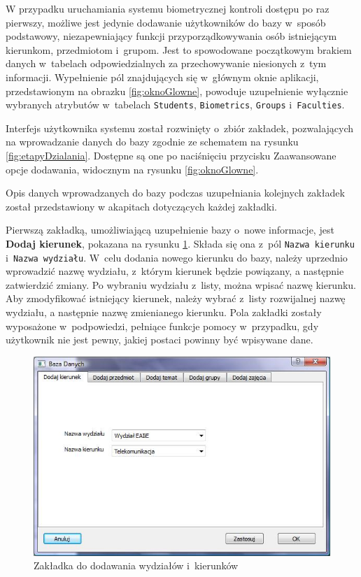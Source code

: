 W przypadku uruchamiania systemu biometrycznej kontroli dostępu po raz pierwszy, możliwe jest jedynie dodawanie użytkowników do bazy w~sposób podstawowy, niezapewniający funkcji przyporządkowywania osób istniejącym kierunkom, przedmiotom i~grupom. Jest to spowodowane początkowym brakiem danych w~tabelach odpowiedzialnych za przechowywanie niesionych z~tym informacji. Wypełnienie pól znajdujących się w~głównym oknie aplikacji, przedstawionym na obrazku \ref{fig:oknoGlowne}, powoduje uzupełnienie wyłącznie wybranych atrybutów w~tabelach \verb!Students!, \verb!Biometrics!, \verb!Groups! i~\verb!Faculties!.

Interfejs użytkownika systemu został rozwinięty o~zbiór zakładek, pozwalających na wprowadzanie danych do bazy zgodnie ze schematem na rysunku \ref{fig:etapyDzialania}. Dostępne są one po naciśnięciu przycisku Zaawansowane opcje dodawania, widocznym na rysunku \ref{fig:oknoGlowne}.

Opis danych wprowadzanych do bazy podczas uzupełniania kolejnych zakładek został przedstawiony w akapitach dotyczących każdej zakładki.  


Pierwszą zakładką, umożliwiającą uzupełnienie bazy o~nowe informacje, jest \textbf{Dodaj kierunek}, pokazana na rysunku \ref{fig:dodajSpecjalizacje}. Składa się ona z~pól \verb!Nazwa kierunku! i~\verb!Nazwa wydziału!. W~celu dodania nowego kierunku do bazy, należy uprzednio wprowadzić nazwę wydziału, z~którym kierunek będzie powiązany, a następnie zatwierdzić zmiany. Po wybraniu wydziału z~listy, można wpisać nazwę kierunku. Aby zmodyfikować istniejący kierunek, należy wybrać z~listy rozwijalnej nazwę wydziału, a następnie nazwę zmienianego kierunku. Pola zakładki zostały wyposażone w~podpowiedzi, pełniące funkcje pomocy w~przypadku, gdy użytkownik nie jest pewny, jakiej postaci powinny być wpisywane dane. 

\begin{figure}
\begin{center}
\includegraphics[scale=0.7]{dodaj_kierunek.jpg}
\caption{Zakładka do dodawania wydziałów i~kierunków}
\label{fig:dodajSpecjalizacje}
\end{center}
\end{figure}

